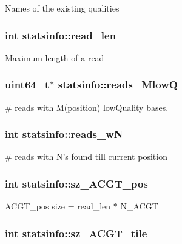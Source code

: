 Names of the existing qualities \hypertarget{structstatsinfo_a90c9a180632378e22ab9b0358daf3f0d}{
\subsubsection[{read\+\_\+len}]{\setlength{\rightskip}{0pt plus 5cm}int statsinfo\+::read\+\_\+len}}\label{structstatsinfo_a90c9a180632378e22ab9b0358daf3f0d}
Maximum length of a read \hypertarget{structstatsinfo_a9b58ee91e10fa9301a186ca94e68e6fb}{
\subsubsection[{reads\+\_\+\+Mlow\+Q}]{\setlength{\rightskip}{0pt plus 5cm}uint64\+\_\+t$\ast$ statsinfo\+::reads\+\_\+\+Mlow\+Q}}\label{structstatsinfo_a9b58ee91e10fa9301a186ca94e68e6fb}
\# reads with M(position) low\+Quality bases. \hypertarget{structstatsinfo_a14bb0b9848f2301718833bd2130683b7}{
\subsubsection[{reads\+\_\+w\+N}]{\setlength{\rightskip}{0pt plus 5cm}int statsinfo\+::reads\+\_\+w\+N}}\label{structstatsinfo_a14bb0b9848f2301718833bd2130683b7}
\# reads with N's found till current position \hypertarget{structstatsinfo_ae95899480cc574a09163190663dd504a}{
\subsubsection[{sz\+\_\+\+A\+C\+G\+T\+\_\+pos}]{\setlength{\rightskip}{0pt plus 5cm}int statsinfo\+::sz\+\_\+\+A\+C\+G\+T\+\_\+pos}}\label{structstatsinfo_ae95899480cc574a09163190663dd504a}
A\+C\+G\+T\+\_\+pos size = read\+\_\+len $\ast$ N\+\_\+\+A\+C\+G\+T \hypertarget{structstatsinfo_a4e1223289cbb8f609d522747d4b47b54}{
\subsubsection[{sz\+\_\+\+A\+C\+G\+T\+\_\+tile}]{\setlength{\rightskip}{0pt plus 5cm}int statsinfo\+::sz\+\_\+\+A\+C\+G\+T\+\_\+tile}}\label{structstatsinfo_a4e1223289cbb8f609d522747d4b47b54}
